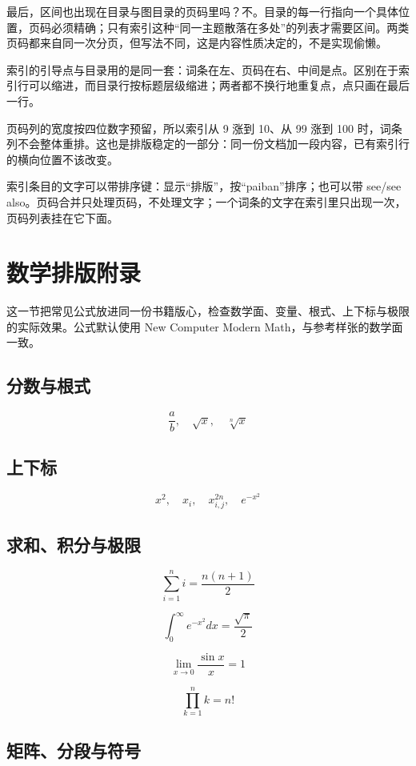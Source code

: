 \documentclass{article}
\begin{document}
最后，区间也出现在目录与图目录的页码里吗？不。目录的每一行指向一个具体位置，页码必须精确；只有索引这种“同一主题散落在多处”的列表才需要区间。两类页码都来自同一次分页，但写法不同，这是内容性质决定的，不是实现偷懒。

索引的引导点与目录用的是同一套：词条在左、页码在右、中间是点。区别在于索引行可以缩进，而目录行按标题层级缩进；两者都不换行地重复点，点只画在最后一行。

页码列的宽度按四位数字预留，所以索引从 9 涨到 10、从 99 涨到 100 时，词条列不会整体重排。这也是排版稳定的一部分：同一份文档加一段内容，已有索引行的横向位置不该改变。

索引条目的文字可以带排序键：显示“排版”，按“paiban”排序；也可以带 see/see also。页码合并只处理页码，不处理文字；一个词条的文字在索引里只出现一次，页码列表挂在它下面。

\newpage

\section{数学排版附录}

这一节把常见公式放进同一份书籍版心，检查数学面、变量、根式、上下标与极限的实际效果。公式默认使用 New Computer Modern Math，与参考样张的数学面一致。

\subsection{分数与根式}

\[
\frac{a}{b}, \quad \sqrt{x}, \quad \sqrt[n]{x}
\]

\subsection{上下标}

\[
x^2, \quad x_i, \quad x_{i,j}^{2n}, \quad e^{-x^2}
\]

\subsection{求和、积分与极限}

\[
\sum_{i=1}^{n} i = \frac{n(n+1)}{2}
\]

\[
\int_{0}^{\infty} e^{-x^2} dx = \frac{\sqrt{\pi}}{2}
\]

\[
\lim_{x \to 0} \frac{\sin x}{x} = 1
\]

\[
\prod_{k=1}^{n} k = n!
\]

\subsection{矩阵、分段与符号}
\end{document}
